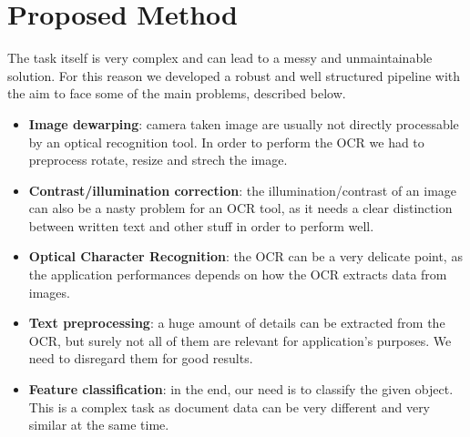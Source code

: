 \documentclass[10pt,twocolumn,letterpaper]{article}
\begin{document}
\section{Proposed Method}
\label{sec:proposed-method}

The task itself is very complex and can lead to a messy and
unmaintainable solution. For this reason we developed a robust and
well structured pipeline with the aim to face some of the main
problems, described below.

\begin{itemize}
  \item \textbf{Image dewarping}: camera taken image are usually not
    directly processable by an optical recognition tool. In order to
    perform the OCR we had to preprocess rotate, resize and strech the
    image.
  \item \textbf{Contrast/illumination correction}: the
    illumination/contrast of an image can also be a nasty problem for
    an OCR tool, as it needs a clear distinction between written text
    and other stuff in order to perform well.
  \item \textbf{Optical Character Recognition}: the OCR can be a very
    delicate point, as the application performances depends on how the
    OCR extracts data from images.
  \item \textbf{Text preprocessing}: a huge amount of details can be
    extracted from the OCR, but surely not all of them are relevant
    for application's purposes. We need to disregard them for good
    results.
  \item \textbf{Feature classification}: in the end, our need is to
    classify the given object. This is a complex task as document data
    can be very different and very similar at the same time.
\end{itemize}
\end{document}
